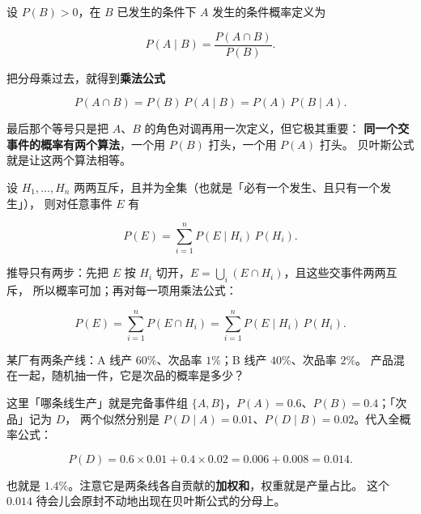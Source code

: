 \documentclass[11pt]{ctexart}
\begin{document}



设 $P(B)>0$，在 $B$ 已发生的条件下 $A$ 发生的条件概率定义为

\[
P(A\mid B)=\frac{P(A\cap B)}{P(B)} .
\]

把分母乘过去，就得到\textbf{乘法公式}

\[
P(A\cap B)=P(B)\,P(A\mid B)=P(A)\,P(B\mid A).
\]

最后那个等号只是把 $A$、$B$ 的角色对调再用一次定义，但它极其重要：
\textbf{同一个交事件的概率有两个算法}，一个用 $P(B)$ 打头，一个用 $P(A)$ 打头。
贝叶斯公式就是让这两个算法相等。


设 $H_{1},\dots,H_{n}$ 两两互斥，且并为全集（也就是「必有一个发生、且只有一个发生」），
则对任意事件 $E$ 有

\[
P(E)=\sum_{i=1}^{n}P(E\mid H_{i})\,P(H_{i}) .
\]

推导只有两步：先把 $E$ 按 $H_{i}$ 切开，$E=\bigcup_{i}(E\cap H_{i})$，且这些交事件两两互斥，
所以概率可加；再对每一项用乘法公式：

\[
P(E)=\sum_{i=1}^{n}P(E\cap H_{i})=\sum_{i=1}^{n}P(E\mid H_{i})\,P(H_{i}) .
\]



某厂有两条产线：A 线产 $60\%$、次品率 $1\%$；B 线产 $40\%$、次品率 $2\%$。
产品混在一起，随机抽一件，它是次品的概率是多少？

这里「哪条线生产」就是完备事件组 $\{A,B\}$，$P(A)=0.6$、$P(B)=0.4$；「次品」记为 $D$，
两个似然分别是 $P(D\mid A)=0.01$、$P(D\mid B)=0.02$。代入全概率公式：

\[
P(D)=0.6\times 0.01+0.4\times 0.02=0.006+0.008=0.014 .
\]

也就是 $1.4\%$。注意它是两条线各自贡献的\textbf{加权和}，权重就是产量占比。
这个 $0.014$ 待会儿会原封不动地出现在贝叶斯公式的分母上。
\end{document}
